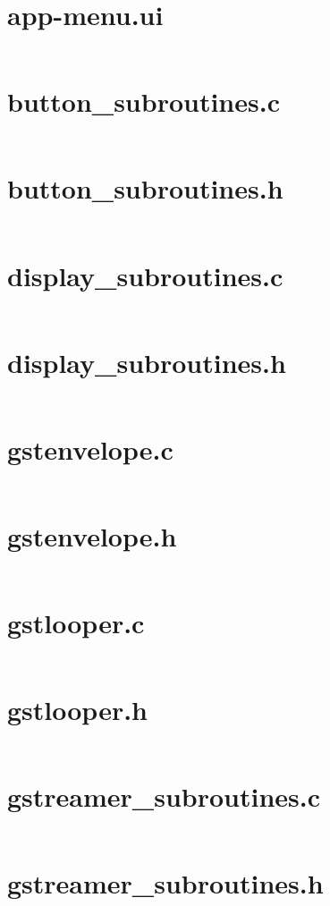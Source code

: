 \documentclass[letterpaper,twoside]{article}
\begin{document}
\tableofcontents

\newpage
\section{app-menu.ui}
\inputminted[breaklines]{xml}{../src/app-menu.ui}
\newpage
\section{button\_subroutines.c}
\inputminted[breaklines]{c}{../src/button_subroutines.c}
\newpage
\section{button\_subroutines.h}
\inputminted[breaklines]{c}{../src/button_subroutines.h}
\newpage
\section{display\_subroutines.c}
\inputminted[breaklines]{c}{../src/display_subroutines.c}
\newpage
\section{display\_subroutines.h}
\inputminted[breaklines]{c}{../src/display_subroutines.h}
\newpage
\section{gstenvelope.c}
\inputminted[breaklines]{c}{../src/gstenvelope.c}
\newpage
\section{gstenvelope.h}
\inputminted[breaklines]{c}{../src/gstenvelope.h}
\newpage
\section{gstlooper.c}
\inputminted[breaklines]{c}{../src/gstlooper.c}
\newpage
\section{gstlooper.h}
\inputminted[breaklines]{c}{../src/gstlooper.h}
\newpage
\section{gstreamer\_subroutines.c}
\inputminted[breaklines]{c}{../src/gstreamer_subroutines.c}
\newpage
\section{gstreamer\_subroutines.h}
\inputminted[breaklines]{c}{../src/gstreamer_subroutines.h}
\newpage
\end{document}
